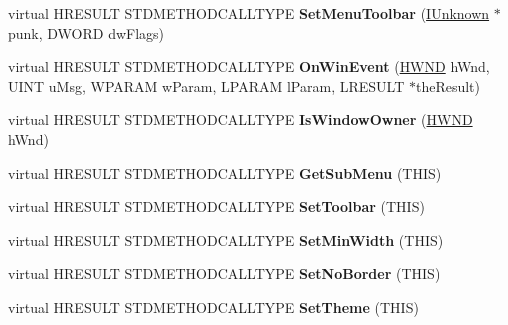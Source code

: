 \begin{DoxyCompactItemize}
\item 
\mbox{\label{class_c_menu_band_a7551b3d2e74ac77b8fc5b70a18c18b5b}} 
virtual H\+R\+E\+S\+U\+LT S\+T\+D\+M\+E\+T\+H\+O\+D\+C\+A\+L\+L\+T\+Y\+PE {\bfseries Set\+Menu\+Toolbar} (\hyperlink{interface_i_unknown}{I\+Unknown} $\ast$punk, D\+W\+O\+RD dw\+Flags)
\item 
\mbox{\label{class_c_menu_band_a7000384ffcdbf6bfccf6759ee62f9a61}} 
virtual H\+R\+E\+S\+U\+LT S\+T\+D\+M\+E\+T\+H\+O\+D\+C\+A\+L\+L\+T\+Y\+PE {\bfseries On\+Win\+Event} (\hyperlink{interfacevoid}{H\+W\+ND} h\+Wnd, U\+I\+NT u\+Msg, W\+P\+A\+R\+AM w\+Param, L\+P\+A\+R\+AM l\+Param, L\+R\+E\+S\+U\+LT $\ast$the\+Result)
\item 
\mbox{\label{class_c_menu_band_a083bbb0e05ccabdd3c67c424c808eaed}} 
virtual H\+R\+E\+S\+U\+LT S\+T\+D\+M\+E\+T\+H\+O\+D\+C\+A\+L\+L\+T\+Y\+PE {\bfseries Is\+Window\+Owner} (\hyperlink{interfacevoid}{H\+W\+ND} h\+Wnd)
\item 
\mbox{\label{class_c_menu_band_acde3090a72dee72618cd6950dd2eb5d2}} 
virtual H\+R\+E\+S\+U\+LT S\+T\+D\+M\+E\+T\+H\+O\+D\+C\+A\+L\+L\+T\+Y\+PE {\bfseries Get\+Sub\+Menu} (T\+H\+IS)
\item 
\mbox{\label{class_c_menu_band_ae270f332065765a35e687c2414f7653a}} 
virtual H\+R\+E\+S\+U\+LT S\+T\+D\+M\+E\+T\+H\+O\+D\+C\+A\+L\+L\+T\+Y\+PE {\bfseries Set\+Toolbar} (T\+H\+IS)
\item 
\mbox{\label{class_c_menu_band_ae389fb84526539ea5f3f8389f83d4df0}} 
virtual H\+R\+E\+S\+U\+LT S\+T\+D\+M\+E\+T\+H\+O\+D\+C\+A\+L\+L\+T\+Y\+PE {\bfseries Set\+Min\+Width} (T\+H\+IS)
\item 
\mbox{\label{class_c_menu_band_a48b941924e1a281a067f7b86c9d15b47}} 
virtual H\+R\+E\+S\+U\+LT S\+T\+D\+M\+E\+T\+H\+O\+D\+C\+A\+L\+L\+T\+Y\+PE {\bfseries Set\+No\+Border} (T\+H\+IS)
\item 
\mbox{\label{class_c_menu_band_a80eb812c5291ddb0fddee3b856119d05}} 
virtual H\+R\+E\+S\+U\+LT S\+T\+D\+M\+E\+T\+H\+O\+D\+C\+A\+L\+L\+T\+Y\+PE {\bfseries Set\+Theme} (T\+H\+IS)
\item 

\end{DoxyCompactItemize}
